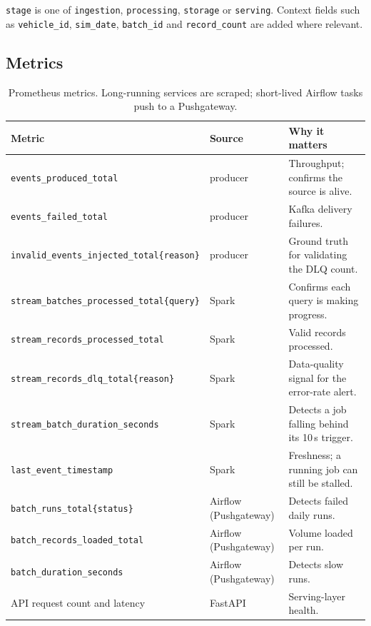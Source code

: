 \documentclass[11pt,a4paper]{article}
\newcommand{\code}[1]{\texttt{\small #1}}
\begin{document}
\noindent \code{stage} is one of \code{ingestion}, \code{processing}, \code{storage} or
\code{serving}. Context fields such as \code{vehicle\_id}, \code{sim\_date}, \code{batch\_id} and
\code{record\_count} are added where relevant.

\subsection{Metrics}

\begin{table}[H]
\centering\small
\begin{tabularx}{\linewidth}{l l Y}
\toprule
\textbf{Metric} & \textbf{Source} & \textbf{Why it matters} \\
\midrule
\code{events\_produced\_total} & producer & Throughput; confirms the source is alive. \\
\code{events\_failed\_total} & producer & Kafka delivery failures. \\
\code{invalid\_events\_injected\_total\{reason\}} & producer & Ground truth for validating the
DLQ count. \\
\code{stream\_batches\_processed\_total\{query\}} & Spark & Confirms each query is making
progress. \\
\code{stream\_records\_processed\_total} & Spark & Valid records processed. \\
\code{stream\_records\_dlq\_total\{reason\}} & Spark & Data-quality signal for the error-rate
alert. \\
\code{stream\_batch\_duration\_seconds} & Spark & Detects a job falling behind its 10\,s
trigger. \\
\code{last\_event\_timestamp} & Spark & Freshness; a running job can still be stalled. \\
\code{batch\_runs\_total\{status\}} & Airflow (Pushgateway) & Detects failed daily runs. \\
\code{batch\_records\_loaded\_total} & Airflow (Pushgateway) & Volume loaded per run. \\
\code{batch\_duration\_seconds} & Airflow (Pushgateway) & Detects slow runs. \\
API request count and latency & FastAPI & Serving-layer health. \\
\bottomrule
\end{tabularx}
\caption{Prometheus metrics. Long-running services are scraped; short-lived Airflow tasks push
to a Pushgateway.}
\label{tab:metrics}
\end{table}
\end{document}
